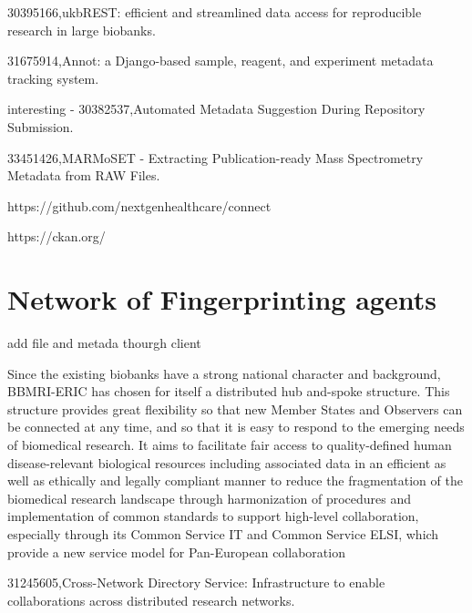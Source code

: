 30395166,ukbREST: efficient and streamlined data access for reproducible research in large biobanks.

31675914,Annot: a Django-based sample, reagent, and experiment metadata tracking system.

interesting - 30382537,Automated Metadata Suggestion During Repository Submission.

33451426,MARMoSET - Extracting Publication-ready Mass Spectrometry Metadata from RAW Files.

https://github.com/nextgenhealthcare/connect

https://ckan.org/

\section{Network of Fingerprinting agents}
\cite{egenvar}
add file and metada thourgh client

\cite{datasphere}
\cite{ehr4cr}
\cite{popmed}
\cite{gaain}

\cite{bbmieric} Since the existing biobanks have a strong national character and background, BBMRI-ERIC has chosen for itself a distributed hub and-spoke structure. This structure provides great flexibility so that new Member States and Observers can be connected at any time, and so that it is easy to respond to the emerging needs of biomedical research. It aims to facilitate fair access to quality-defined human disease-relevant biological resources including associated data in an efficient as well as ethically and legally compliant manner to reduce the fragmentation of the biomedical research landscape through harmonization of procedures and implementation of common standards to support high-level collaboration, especially through its Common Service IT and Common Service ELSI, which provide a new service model for Pan-European collaboration

31245605,Cross-Network Directory Service: Infrastructure to enable collaborations across distributed research networks.
